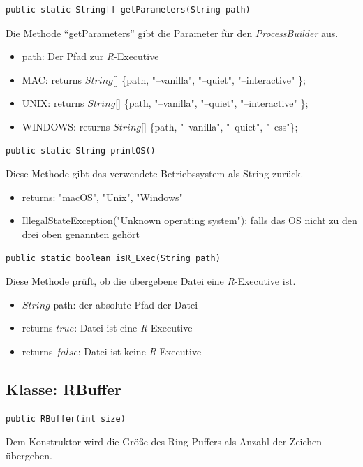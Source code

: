 \documentclass[a4paper, 12pt]{report} %
\begin{document}
\lstset{language=Java}
\begin{lstlisting}[frame=single]
public static String[] getParameters(String path)
\end{lstlisting}
Die Methode "`getParameters"' gibt die Parameter für den \textit{ProcessBuilder} aus.
\begin{itemize}
	\item path: Der Pfad zur \textit{R}-Executive 
	\item MAC: returns $String$[] \{path, "--vanilla", "--quiet", "--interactive" \};
	\item UNIX: returns $String$[] \{path, "--vanilla", "--quiet", "--interactive" \};
	\item WINDOWS: returns $String$[] \{path, "--vanilla", "--quiet", "--ess"\};
\end{itemize}

\lstset{language=Java}
\begin{lstlisting}[frame=single]
public static String printOS()
\end{lstlisting}
Diese Methode gibt das verwendete Betriebssystem als String zurück.
\begin{itemize}
	\item returns: "macOS", "{}Unix", "Windows"
	\item IllegalStateException("{}Unknown operating system"): falls das OS nicht zu den drei oben genannten gehört
\end{itemize}

\lstset{language=Java}
\begin{lstlisting}[frame=single]
public static boolean isR_Exec(String path)
\end{lstlisting}
Diese Methode prüft, ob die übergebene Datei eine \textit{R}-Executive ist.
\begin{itemize}
	\item $String$ path: der absolute Pfad der Datei
	\item returns $true$: Datei ist eine \textit{R}-Executive
	\item returns $false$: Datei ist keine \textit{R}-Executive
\end{itemize}

\subsection{Klasse: RBuffer}

\lstset{language=Java}
\begin{lstlisting}[frame=single]
public RBuffer(int size)
\end{lstlisting}
Dem Konstruktor wird die Größe des Ring-Puffers als Anzahl der Zeichen übergeben.\\
\end{document}
